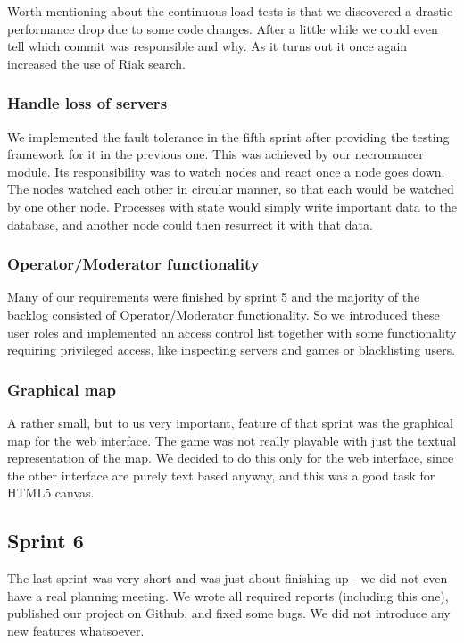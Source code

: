 \documentclass[11pt,a4paper]{report}
\begin{document}
Worth mentioning about the continuous load tests is that we discovered a drastic
performance drop due to some code changes. After a little while we could even
tell which commit was responsible and why. As it turns out it once again
increased the use of Riak search.

\subsubsection{Handle loss of servers}
We implemented the fault tolerance in the fifth sprint after providing the
testing framework for it in the previous one. This was achieved by our
necromancer module. Its responsibility was to watch nodes and react once a node
goes down. The nodes watched each other in circular manner, so that each would
be watched by one other node. Processes with state would simply write important
data to the database, and another node could then resurrect it with that data.

\subsubsection{Operator/Moderator functionality}
Many of our requirements were finished by sprint 5 and the majority of the
backlog consisted of Operator/Moderator functionality. So we introduced these
user roles and implemented an access control list together with some
functionality requiring privileged access, like inspecting servers and games or
blacklisting users.

\subsubsection{Graphical map}
A rather small, but to us very important, feature of that sprint was the
graphical map for the web interface. The game was not really playable with just
the textual representation of the map. We decided to do this only for the web
interface, since the other interface are purely text based anyway, and this was
a good task for HTML5 canvas\cite{html5_canvas}.
\subsection*{Sprint 6}
The last sprint was very short and was just about finishing up - we did not even
have a real planning meeting. We wrote all required reports (including this
one), published our project on Github, and fixed some bugs. We did not
introduce any new features whatsoever.
\end{document}
